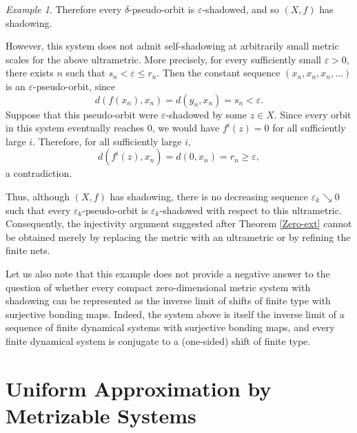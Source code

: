 \documentclass[12pt]{amsart}
\theoremstyle{definition}
\numberwithin{equation}{section}
\theoremstyle{remark}
\newtheorem{example}[theorem]{Example}
\begin{document}
\begin{example}
Therefore every $\delta$-pseudo-orbit is $\varepsilon$-shadowed, and so
$(X,f)$ has shadowing.

However, this system does not admit self-shadowing at arbitrarily small metric
scales for the above ultrametric. More precisely, for every sufficiently small
$\varepsilon>0$, there exists $n$ such that $s_n<\varepsilon\leq r_n$. Then the
constant sequence $(x_n,x_n,x_n,\ldots)$ is an $\varepsilon$-pseudo-orbit, since
\[
    d(f(x_n),x_n)=d(y_n,x_n)=s_n<\varepsilon.
\]
Suppose that this pseudo-orbit were $\varepsilon$-shadowed by some $z\in X$.
Since every orbit in this system eventually reaches $0$, we would have
$f^i(z)=0$ for all sufficiently large $i$. Therefore, for all sufficiently large
$i$,
\[
    d(f^i(z),x_n)=d(0,x_n)=r_n\geq \varepsilon,
\]
a contradiction.

Thus, although $(X,f)$ has shadowing, there is no decreasing sequence
$\varepsilon_k\searrow 0$ such that every $\varepsilon_k$-pseudo-orbit is
$\varepsilon_k$-shadowed with respect to this ultrametric. Consequently, the
injectivity argument suggested after Theorem \ref{Zero-ext} cannot be obtained
merely by replacing the metric with an ultrametric or by refining the finite
nets.

Let us also note that this example does not provide a negative answer to the question of whether every compact zero-dimensional metric system with shadowing can be represented as the inverse limit of shifts of finite type with surjective bonding maps. Indeed, the system above is itself the inverse limit of a sequence of finite dynamical systems with surjective bonding maps, and every finite dynamical system is conjugate to a (one-sided) shift of finite type.
\end{example}






\section{Uniform Approximation by Metrizable Systems}\label{s4}
\end{document}
